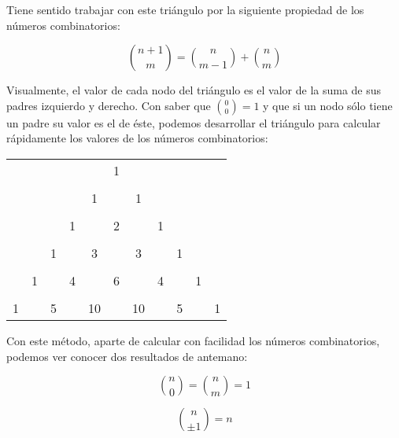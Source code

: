 Tiene sentido trabajar con este triángulo por la siguiente propiedad de los números combinatorios:

\[{n+1 \choose m} = {n \choose m-1} + {n \choose m}\]

Visualmente, el valor de cada nodo del triángulo es el valor de la suma de sus padres izquierdo y derecho.
Con saber que ${0 \choose 0} = 1$ y que si un nodo sólo tiene un padre su valor es el de éste, podemos desarrollar el triángulo para calcular rápidamente los valores de los números combinatorios:

\begin{center}
\begin{tabular}{c c c c c c c c c c c}
   &   &   &   &    & 1 &    &   &   &   &   \\
   &   &   &   &    &   &    &   &   &   &   \\
   &   &   &   & 1  &   & 1  &   &   &   &   \\
   &   &   &   &    &   &    &   &   &   &   \\
   &   &   & 1 &    & 2 &    & 1 &   &   &   \\
   &   &   &   &    &   &    &   &   &   &   \\
   &   & 1 &   & 3  &   & 3  &   & 1 &   &   \\
   &   &   &   &    &   &    &   &   &   &   \\
   & 1 &   & 4 &    & 6 &    & 4 &   & 1 &   \\
   &   &   &   &    &   &    &   &   &   &   \\
 1 &   & 5 &   & 10 &   & 10 &   & 5 &   & 1 \\
\end{tabular}
\end{center}

Con este método, aparte de calcular con facilidad los números combinatorios, podemos ver conocer dos resultados de antemano:

\[{n \choose 0} = {n \choose m} = 1\]

\[{n \choose \pm1} = n\]
